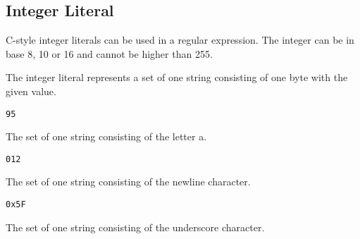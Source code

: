 
\subsection{Integer Literal}
{
	C-style integer literals can be used in a regular expression.
	The integer can be in base 8, 10 or 16 and cannot be higher than 255.
	
	The integer literal represents a set of one string consisting of one byte
	with the given value.
	
	\begin{itemize}
	{
		\item[] \lstinline[language=MAIA, columns=fixed]@95@
		
			The set of one string consisting of the letter a.
		
		\item[] \lstinline[language=MAIA, columns=fixed]@012@
		
			The set of one string consisting of the
			newline character.
		
		\item[] \lstinline[language=MAIA, columns=fixed]@0x5F@
		
			The set of one string consisting of the
			underscore character.
	}
	\end{itemize}
}
